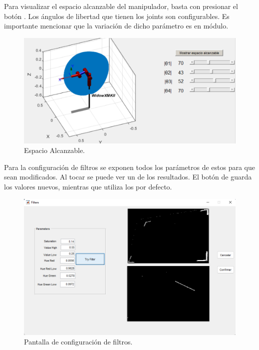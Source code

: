 Para visualizar el espacio alcanzable del manipulador, basta con presionar el botón . Los ángulos de libertad que tienen los joints son configurables. Es importante mencionar que la variación de dicho parámetro es en módulo.
\begin{figure}[H]
	\centering
	\includegraphics[width=0.7\linewidth]{alcanzable}
	\caption{Espacio Alcanzable.}	
	\label{fig:alcanzable}
\end{figure}


Para la configuración de filtros se exponen todos los parámetros de estos para que sean modificados. Al tocar  se puede ver un  de los resultados.
El botón de  guarda los valores nuevos, mientras que  utiliza los por defecto.

\begin{figure}[H]
	\centering
	\includegraphics[width=\linewidth]{filtros}
	\caption{Pantalla de configuración de filtros.}	
	\label{fig:filtros}
\end{figure}


